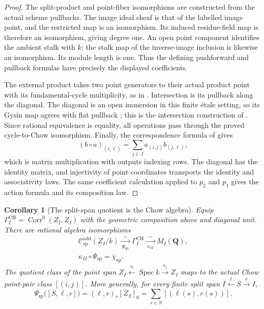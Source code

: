 \documentclass[11pt]{article}
\newtheorem{corollary}[theorem]{Corollary}
\theoremstyle{definition}
\theoremstyle{remark}
\DeclareMathOperator{\Spec}{Spec}
\newcommand{\Q}{\mathbf Q}
\begin{document}
\begin{proof}
The split-product and point-fiber isomorphisms are constructed from the
actual scheme pullbacks.  The image ideal sheaf is that of the labelled
image point, and the restricted map is an isomorphism.  Its induced
residue-field map is therefore an isomorphism, giving degree one.  An
open point component identifies the ambient stalk with \(k\); the stalk
map of the inverse-image inclusion is likewise an isomorphism.  Its
module length is one.  Thus the defining pushforward and pullback
formulas have precisely the displayed coefficients.

The external product takes two point generators to their actual product
point with its fundamental-cycle multiplicity, as in
\cite{StacksExteriorProduct}.  Intersection is its pullback along the
diagonal.  The diagonal
is an open immersion in this finite \'etale setting, so its Gysin map
agrees with flat pullback \cite{StacksFlatGysinComparison}; this is the
intersection construction of \cite{StacksIntersectionProduct}.
Since rational equivalence is equality, all operations pass through the
proved cycle-to-Chow isomorphism.
Finally, the correspondence formula of
\cite{StacksChowCorrespondenceDefinition} gives
\[
 (b\circ a)_{(i,\ell)}
    =\sum_{j\in J}a_{(i,j)}b_{(j,\ell)},
\]
which is matrix multiplication with outputs indexing rows.  The diagonal
has the identity matrix, and injectivity of point coordinates transports
the identity and associativity laws.
The same coefficient calculation applied to \(p_2\) and \(p_1\)
gives the action formula and its composition law.
\end{proof}

\begin{corollary}[The split-span quotient is the Chow algebra]
\label{cor:split-span-chow-algebra}
Equip
\(\Gamma_I^{\mathrm{CH}}=\operatorname{Corr}^0(Z_I,Z_I)\)
with the geometric composition above and diagonal unit.  There are
rational algebra isomorphisms
\[
 \begin{gathered}
 \mathcal C_{\mathrm{sp}}^{\mathrm{add}}(Z_I/k)
   \xrightarrow[\ \Psi_{\mathrm{sp}}\ ]{\sim}
 \Gamma_I^{\mathrm{CH}}
   \xrightarrow[\ \kappa_{II}\ ]{\sim} M_I(\Q),\\
 \kappa_{II}\circ\Psi_{\mathrm{sp}}
     =\overline\chi_{\mathrm{sp}}.
 \end{gathered}
\]
The quotient class of the point span
\(Z_I\xleftarrow{s_i}\Spec k\xrightarrow{s_j}Z_I\)
maps to the actual Chow point-pair class \([(i,j)]\).
More generally, for every finite split span
\(I\xleftarrow{\ell}S\xrightarrow{r}I\),
\[
 \Psi_{\mathrm{sp}}\bigl(\overline{[S,\ell,r]}\bigr)
   =(\ell,r)_*[Z_S]_0
   =\sum_{s\in S}[(\ell(s),r(s))].
\]
\end{corollary}
\end{document}
